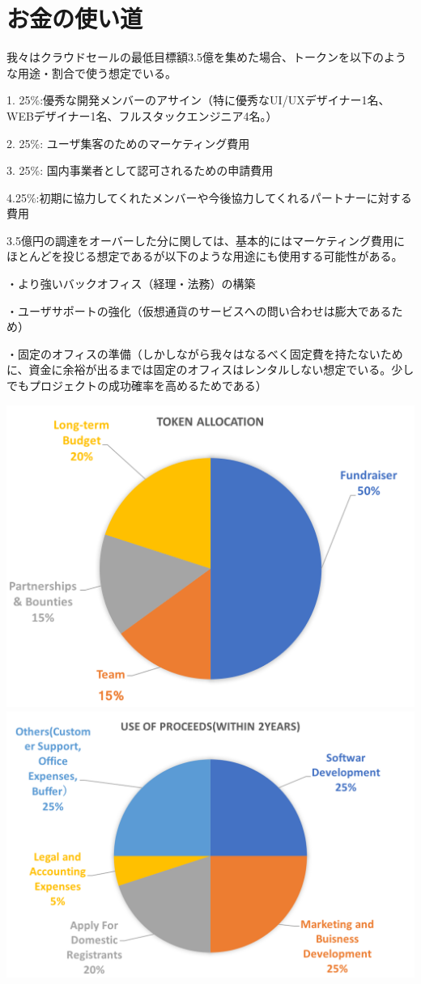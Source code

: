 \documentclass{jsarticle}
\begin{document}
\section{お金の使い道}
我々はクラウドセールの最低目標額3.5億を集めた場合、トークンを以下のような用途・割合で使う想定でいる。

1. 25\%:優秀な開発メンバーのアサイン（特に優秀なUI/UXデザイナー1名、WEBデザイナー1名、フルスタックエンジニア4名。）

2. 25\%: ユーザ集客のためのマーケティング費用

3. 25\%: 国内事業者として認可されるための申請費用

4.25\%:初期に協力してくれたメンバーや今後協力してくれるパートナーに対する費用

3.5億円の調達をオーバーした分に関しては、基本的にはマーケティング費用にほとんどを投じる想定であるが以下のような用途にも使用する可能性がある。

・より強いバックオフィス（経理・法務）の構築 

・ユーザサポートの強化（仮想通貨のサービスへの問い合わせは膨大であるため）

・固定のオフィスの準備（しかしながら我々はなるべく固定費を持たないために、資金に余裕が出るまでは固定のオフィスはレンタルしない想定でいる。少しでもプロジェクトの成功確率を高めるためである）

	\includegraphics[scale=0.4]{img/tokenallocation.png}
	\includegraphics[scale=0.4]{img/useofproceeds.png}
\end{document}
